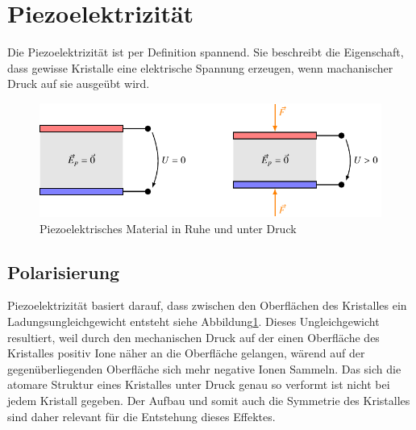 \section{Piezoelektrizität}
Die Piezoelektrizität ist per Definition spannend.
Sie beschreibt die Eigenschaft, dass gewisse Kristalle eine elektrische Spannung erzeugen, wenn machanischer Druck auf sie ausgeübt wird.

\begin{figure}
    \centering
    \includegraphics[]{papers/punktgruppen/figures/piezo} %
    \caption{Piezoelektrisches Material in Ruhe und unter Druck}
    \label{fig:punktgruppen:basicPiezo}
\end{figure}

\subsection{Polarisierung}
Piezoelektrizität basiert darauf, dass zwischen den Oberflächen des Kristalles ein Ladungsungleichgewicht entsteht siehe Abbildung\ref{fig:punktgruppen:basicPiezo}.
Dieses Ungleichgewicht resultiert, 
weil durch den mechanischen Druck auf der einen Oberfläche des Kristalles positiv Ione näher an die Oberfläche gelangen,
wärend auf der gegenüberliegenden Oberfläche sich mehr negative Ionen Sammeln.
Das sich die atomare Struktur eines Kristalles unter Druck genau so verformt ist nicht bei jedem Kristall gegeben.
Der Aufbau und somit auch die Symmetrie des Kristalles sind daher relevant für die Entstehung dieses Effektes.

